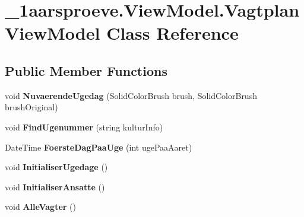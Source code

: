 \hypertarget{class__1aarsproeve_1_1_view_model_1_1_vagtplan_view_model}{}\section{\+\_\+1aarsproeve.\+View\+Model.\+Vagtplan\+View\+Model Class Reference}
\label{class__1aarsproeve_1_1_view_model_1_1_vagtplan_view_model}
\subsection*{Public Member Functions}
\begin{DoxyCompactItemize}
\item 
\hypertarget{class__1aarsproeve_1_1_view_model_1_1_vagtplan_view_model_a584ab28ecfddbb2248d7b55a3ed10a34}{}void {\bfseries Nuvaerende\+Ugedag} (Solid\+Color\+Brush brush, Solid\+Color\+Brush brush\+Original)\label{class__1aarsproeve_1_1_view_model_1_1_vagtplan_view_model_a584ab28ecfddbb2248d7b55a3ed10a34}

\item 
\hypertarget{class__1aarsproeve_1_1_view_model_1_1_vagtplan_view_model_a5e3b5ba40e74748da6c018f8547d8baa}{}void {\bfseries Find\+Ugenummer} (string kultur\+Info)\label{class__1aarsproeve_1_1_view_model_1_1_vagtplan_view_model_a5e3b5ba40e74748da6c018f8547d8baa}

\item 
\hypertarget{class__1aarsproeve_1_1_view_model_1_1_vagtplan_view_model_a8b8894a622f861e335c3e171a4ba93bc}{}Date\+Time {\bfseries Foerste\+Dag\+Paa\+Uge} (int uge\+Paa\+Aaret)\label{class__1aarsproeve_1_1_view_model_1_1_vagtplan_view_model_a8b8894a622f861e335c3e171a4ba93bc}

\item 
\hypertarget{class__1aarsproeve_1_1_view_model_1_1_vagtplan_view_model_ad4620a85449f88c843d594dfb7e2f5fa}{}void {\bfseries Initialiser\+Ugedage} ()\label{class__1aarsproeve_1_1_view_model_1_1_vagtplan_view_model_ad4620a85449f88c843d594dfb7e2f5fa}

\item 
\hypertarget{class__1aarsproeve_1_1_view_model_1_1_vagtplan_view_model_a5616979ee0bb0fe1904d965f2b688560}{}void {\bfseries Initialiser\+Ansatte} ()\label{class__1aarsproeve_1_1_view_model_1_1_vagtplan_view_model_a5616979ee0bb0fe1904d965f2b688560}

\item 
\hypertarget{class__1aarsproeve_1_1_view_model_1_1_vagtplan_view_model_a1e49e7514900058b5cd36e4991e08b23}{}void {\bfseries Alle\+Vagter} ()\label{class__1aarsproeve_1_1_view_model_1_1_vagtplan_view_model_a1e49e7514900058b5cd36e4991e08b23}


\end{DoxyCompactItemize}
